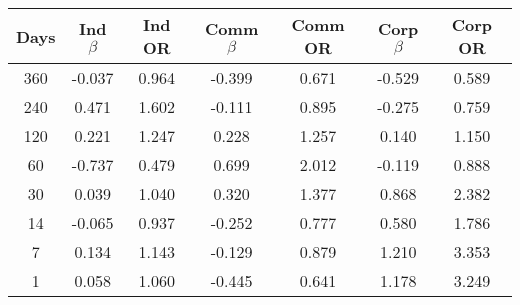 \begin{tabular}{||c c c c c c c ||}
\hline
Days & Ind $\beta$ & Ind OR & Comm $\beta$ & Comm OR & Corp $\beta$ & Corp OR \\
\hline\hline
360 & -0.037 & 0.964 & -0.399 & 0.671 & -0.529 & 0.589 \\
240 & 0.471 & 1.602 & -0.111 & 0.895 & -0.275 & 0.759 \\
120 & 0.221 & 1.247 & 0.228 & 1.257 & 0.140 & 1.150 \\
60 & -0.737 & 0.479 & 0.699 & 2.012 & -0.119 & 0.888 \\
30 & 0.039 & 1.040 & 0.320 & 1.377 & 0.868 & 2.382 \\
14 & -0.065 & 0.937 & -0.252 & 0.777 & 0.580 & 1.786 \\
7 & 0.134 & 1.143 & -0.129 & 0.879 & 1.210 & 3.353 \\
1 & 0.058 & 1.060 & -0.445 & 0.641 & 1.178 & 3.249 \\
\hline
\end{tabular}
